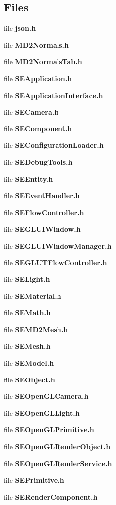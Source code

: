 \subsection*{Files}
\begin{DoxyCompactItemize}
\item 
file {\bf json.\+h}
\item 
file {\bf M\+D2\+Normals.\+h}
\item 
file {\bf M\+D2\+Normals\+Tab.\+h}
\item 
file {\bf S\+E\+Application.\+h}
\item 
file {\bf S\+E\+Application\+Interface.\+h}
\item 
file {\bf S\+E\+Camera.\+h}
\item 
file {\bf S\+E\+Component.\+h}
\item 
file {\bf S\+E\+Configuration\+Loader.\+h}
\item 
file {\bf S\+E\+Debug\+Tools.\+h}
\item 
file {\bf S\+E\+Entity.\+h}
\item 
file {\bf S\+E\+Event\+Handler.\+h}
\item 
file {\bf S\+E\+Flow\+Controller.\+h}
\item 
file {\bf S\+E\+G\+L\+U\+I\+Window.\+h}
\item 
file {\bf S\+E\+G\+L\+U\+I\+Window\+Manager.\+h}
\item 
file {\bf S\+E\+G\+L\+U\+T\+Flow\+Controller.\+h}
\item 
file {\bf S\+E\+Light.\+h}
\item 
file {\bf S\+E\+Material.\+h}
\item 
file {\bf S\+E\+Math.\+h}
\item 
file {\bf S\+E\+M\+D2\+Mesh.\+h}
\item 
file {\bf S\+E\+Mesh.\+h}
\item 
file {\bf S\+E\+Model.\+h}
\item 
file {\bf S\+E\+Object.\+h}
\item 
file {\bf S\+E\+Open\+G\+L\+Camera.\+h}
\item 
file {\bf S\+E\+Open\+G\+L\+Light.\+h}
\item 
file {\bf S\+E\+Open\+G\+L\+Primitive.\+h}
\item 
file {\bf S\+E\+Open\+G\+L\+Render\+Object.\+h}
\item 
file {\bf S\+E\+Open\+G\+L\+Render\+Service.\+h}
\item 
file {\bf S\+E\+Primitive.\+h}
\item 
file {\bf S\+E\+Render\+Component.\+h}

\end{DoxyCompactItemize}
